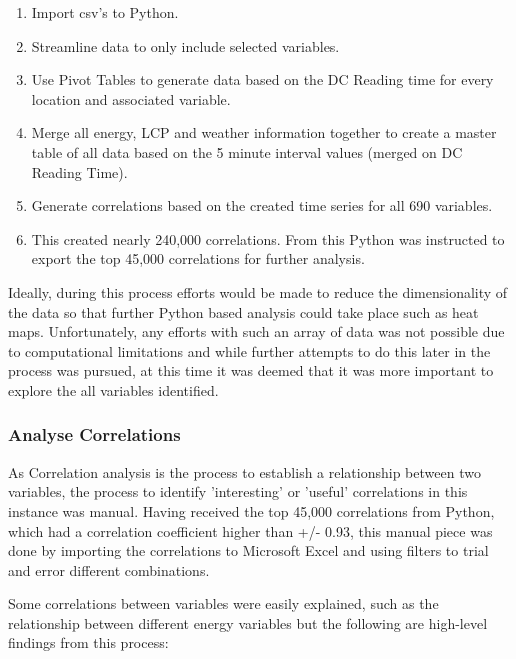 \documentclass[12pt]{scrartcl}
\begin{document}
\begin{enumerate}
\item Import csv's to Python.
\item Streamline data to only include selected variables. 
\item Use Pivot Tables to generate data based on the DC Reading time for every location and associated variable. 
\item Merge all energy, \gls{LCP} and weather information together to create a master table of all data based on the 5 minute interval values (merged on DC Reading Time).
\item Generate correlations based on the created time series for all 690 variables.
\item This created nearly 240,000 correlations. From this Python was instructed to export the top 45,000 correlations for further analysis.
\end{enumerate} 

Ideally, during this process efforts would be made to reduce the dimensionality of the data so that further Python based analysis could take place such as heat maps. Unfortunately, any efforts with such an array of data was not possible due to computational limitations and while further attempts to do this later in the process was pursued, at this time it was deemed that it was more important to explore the all variables identified.

\subsubsection{Analyse Correlations}
\label{subsubsec:[Analyse Correlations]}

As Correlation analysis is the process to establish a relationship between two variables, the process to identify 'interesting' or 'useful' correlations in this instance was manual. Having received the top 45,000 correlations from Python, which had a correlation coefficient higher than +/- 0.93, this manual piece was done by importing the correlations to Microsoft Excel and using filters to trial and error different combinations. 

Some correlations between variables were easily explained, such as the relationship between different energy variables but the following are high-level findings from this process:    
\end{document}
